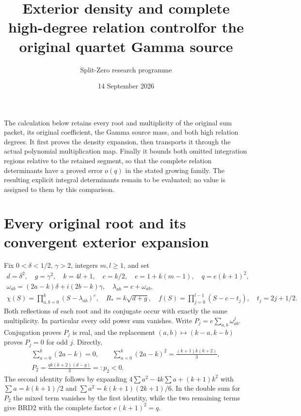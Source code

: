\documentclass[11pt,a4paper]{article}
\title{Exterior density and complete high-degree relation control\newline for the original quartet Gamma source}
\author{Split-Zero research programme}
\date{14 September 2026}
\begin{document}
\maketitle

The calculation below retains every root and multiplicity of the
original sum packet, its original coefficient, the Gamma source mass,
and both high relation degrees. It first proves the density expansion,
then transports it through the actual polynomial multiplication map.
Finally it bounds both omitted integration regions relative to the
retained segment, so that the complete relation determinants have a
proved error $o(q)$ in the stated growing family. The resulting
explicit integral determinants remain to be evaluated; no value is
assigned to them by this comparison.

\section{Every original root and its convergent exterior expansion}

Fix $0<\delta<1/2$, $\gamma>2$, integers $m,l\geq1$, and set
\[
\begin{gathered}
 d=\delta^2,\quad g=\gamma^2,\quad k=4l+1,\quad
 c=k/2,\quad e=1+k(m-1),\quad q=e(k+1)^2,\\
 \omega_{ab}=(2a-k)\delta+i(2b-k)\gamma,
 \quad \lambda_{ab}=c+\omega_{ab},\\
 \chi(S)=\prod_{a,b=0}^k(S-\lambda_{ab})^e,
 \quad R_*=k\sqrt{d+g},\quad
 f(S)=\prod_{j=0}^{l-1}(S-c-t_j),\quad t_j=2j+1/2.
\end{gathered}\tag{BRD1}
\]
Both reflections of each root and its conjugate occur with exactly
the same multiplicity. In particular every odd power sum vanishes.
Write $P_j=e\sum_{a,b}\omega_{ab}^j$. Conjugation proves $P_j$
is real, and the replacement $(a,b)\mapsto(k-a,k-b)$ proves
$P_j=0$ for odd $j$. Directly,
\[
\begin{gathered}
 \sum_{a=0}^k(2a-k)=0,\qquad
 \sum_{a=0}^k(2a-k)^2=\frac{(k+1)k(k+2)}3,\\
 P_2=\frac{qk(k+2)(d-g)}3=:p_2<0.
\end{gathered}\tag{BRD2}
\]
The second identity follows by expanding $4\sum a^2-4k\sum a+
(k+1)k^2$ with $\sum a=k(k+1)/2$ and
$\sum a^2=k(k+1)(2k+1)/6$. In the double sum for $P_2$ the
mixed term vanishes by the first identity, while the two remaining
terms give BRD2 with the complete factor $e(k+1)^2=q$.
\end{document}

